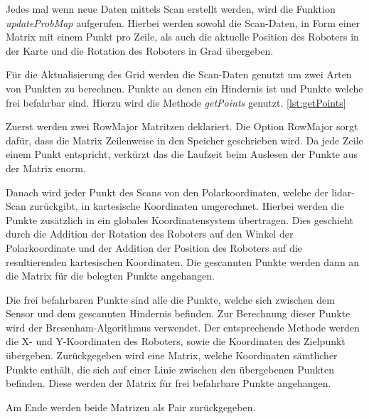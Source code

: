 Jedes mal wenn neue Daten mittels Scan erstellt werden, wird die Funktion \textit{updateProbMap} aufgerufen.
Hierbei werden sowohl die Scan-Daten, in Form einer Matrix mit einem Punkt pro Zeile, 
als auch die aktuelle Position des Roboters in der Karte und die Rotation des Roboters in Grad übergeben.

Für die Aktualisierung des Grid werden die Scan-Daten genutzt um zwei Arten von Punkten zu berechnen.
Punkte an denen ein Hindernis ist und Punkte welche frei befahrbar sind.
Hierzu wird die Methode \textit{getPoints} genutzt. \ref{lst:getPoints}

Zuerst werden zwei RowMajor Matritzen deklariert.
Die Option RowMajor sorgt dafür, dass die Matrix Zeilenweise in den Speicher geschrieben wird.
Da jede Zeile einem Punkt entspricht, verkürzt das die Laufzeit beim Auslesen der Punkte aus der Matrix enorm.

Danach wird jeder Punkt des Scans von den Polarkoordinaten, welche der \ac{lidar}-Scan zurückgibt, in kartesische Koordinaten umgerechnet.
Hierbei werden die Punkte zusätzlich in ein globales Koordinatensystem übertragen.
Dies geschieht durch die Addition der Rotation des Roboters auf den Winkel der Polarkoordinate
und der Addition der Position des Roboters auf die resultierenden kartesischen Koordinaten.
Die gescannten Punkte werden dann an die Matrix für die belegten Punkte angehangen.

Die frei befahrbaren Punkte sind alle die Punkte, welche sich zwischen dem Sensor und dem gescannten Hindernis befinden.
Zur Berechnung dieser Punkte wird der Bresenham-Algorithmus verwendet.
Der entsprechende Methode werden die X- und Y-Koordinaten des Roboters, sowie die Koordinaten des Zielpunkt übergeben.
Zurückgegeben wird eine Matrix, welche Koordinaten sämtlicher Punkte enthält, die sich auf einer Linie zwischen den übergebenen Punkten befinden.
Diese werden der Matrix für frei befahrbare Punkte angehangen.

Am Ende werden beide Matrizen als Pair zurückgegeben.

